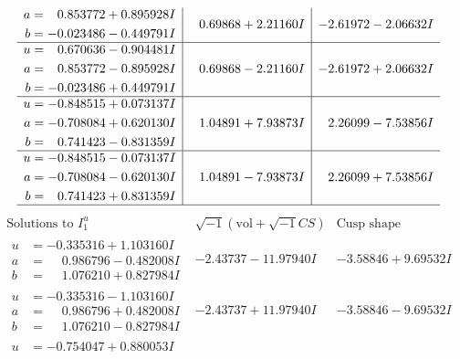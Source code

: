 \documentclass[1p]{elsarticle_modified}
\theoremstyle{definition}
\newcommand{\I}{\sqrt{-1}}
\begin{document}
$$\begin{array}{c|c|c}
\begin{aligned}
a &= \phantom{-}0.853772 + 0.895928 I \\
b &= -0.023486 - 0.449791 I\end{aligned}
 & \phantom{-}0.69868 + 2.21160 I & -2.61972 - 2.06632 I \\ \hline\begin{aligned}
u &= \phantom{-}0.670636 - 0.904481 I \\
a &= \phantom{-}0.853772 - 0.895928 I \\
b &= -0.023486 + 0.449791 I\end{aligned}
 & \phantom{-}0.69868 - 2.21160 I & -2.61972 + 2.06632 I \\ \hline\begin{aligned}
u &= -0.848515 + 0.073137 I \\
a &= -0.708084 + 0.620130 I \\
b &= \phantom{-}0.741423 - 0.831359 I\end{aligned}
 & \phantom{-}1.04891 + 7.93873 I & \phantom{-}2.26099 - 7.53856 I \\ \hline\begin{aligned}
u &= -0.848515 - 0.073137 I \\
a &= -0.708084 - 0.620130 I \\
b &= \phantom{-}0.741423 + 0.831359 I\end{aligned}
 & \phantom{-}1.04891 - 7.93873 I & \phantom{-}2.26099 + 7.53856 I\\
 \hline 
 \end{array}$$\newpage$$\begin{array}{c|c|c}  
\text{Solutions to }I^u_{1}& \I (\text{vol} + \sqrt{-1}CS) & \text{Cusp shape}\\
 \hline 
\begin{aligned}
u &= -0.335316 + 1.103160 I \\
a &= \phantom{-}0.986796 - 0.482008 I \\
b &= \phantom{-}1.076210 + 0.827984 I\end{aligned}
 & -2.43737 - 11.97940 I & -3.58846 + 9.69532 I \\ \hline\begin{aligned}
u &= -0.335316 - 1.103160 I \\
a &= \phantom{-}0.986796 + 0.482008 I \\
b &= \phantom{-}1.076210 - 0.827984 I\end{aligned}
 & -2.43737 + 11.97940 I & -3.58846 - 9.69532 I \\ \hline\begin{aligned}
u &= -0.754047 + 0.880053 I \\

\end{aligned}
\end{array}$$
\end{document}

